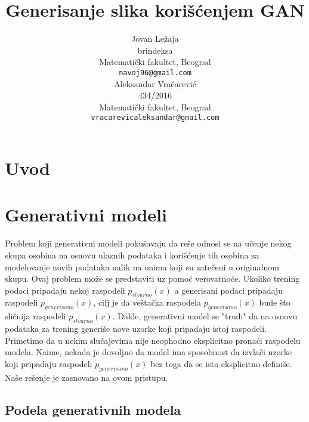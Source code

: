\documentclass[a4paper]{article}
\title{Generisanje slika korišćenjem GAN}
\author{
  Jovan Ležaja \\
  brindeksa\\
  Matematički fakultet, Beograd \\
  \texttt{navoj96@gmail.com} \\
   \And
 Aleksandar Vračarević \\
  434/2016\\
  Matematički fakultet, Beograd \\
  \texttt{vracarevicaleksandar@gmail.com} 
}
\begin{document}
\maketitle

\begin{abstract}
\lipsum[1]
\end{abstract}
\setcounter{tocdepth}{2}
\renewcommand{\contentsname}{Sadržaj}
\tableofcontents

\newpage



\section{Uvod}
\lipsum[2]



\section{Generativni modeli}
\label{sec:genmodeli}

Problem koji generativni modeli pokušavaju da reše odnosi se na učenje nekog skupa osobina na osnovu ulaznih podataka i korišćenje tih osobina za modelovanje novih podataka nalik na onima koji su zatečeni u originalnom skupu. Ovaj problem može se predstaviti uz pomoć verovatnoće. Ukoliko trening podaci pripadaju nekoj raspodeli $p_{stvarno}(x)$ a generisani podaci pripadaju raspodeli $p_{generisano}(x)$, cilj je da veštačka raspodela $p_{generisano}(x)$ bude što sličnija raspodeli $p_{stvarno}(x)$. Dakle, generativni model se "trudi" da na osnovu podataka za trening generiše nove uzorke koji pripadaju istoj raspodeli. Primetimo da u nekim slučajevima nije neophodno eksplicitno pronaći raspodelu modela. Naime, nekada je dovoljno da model ima sposobnost da izvlači uzorke koji pripadaju raspodeli $p_{generisano}(x)$ bez toga da se ista eksplicitno definiše. Naše rešenje je zasnovano na ovom pristupu. 
\subsection{Podela generativnih modela}
\label{subsec:podela}
\end{document}

